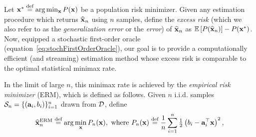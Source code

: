 \begin{table}[t]
\begin{center}
{                  %
                }\vspace*{-1cm}

		\label{tab:comp}
	\end{center}
\end{table}
Let $\mathbf{x}^* \stackrel{\textrm{def}}{=} \arg\min_{\mathbf{x}} P(\mathbf{x})$ be a population risk minimizer.  Given any estimation procedure which returns $\widehat{\mathbf{x}}_n $ using $n$ samples, define the {\em excess risk} (which we also refer to as the \emph{generalization error} or the \emph{error}) of $\widehat{\mathbf{x}}_n$ as $\mathbb{E}\left[P(\widehat{\mathbf{x}}_n)\right]-P(\mathbf{x}^*)$.
Now, equipped a stochastic first-order oracle (equation~\eqref{eq:stochFirstOrderOracle}), our goal is to provide a computationally efficient (and streaming) estimation method whose excess risk is comparable to the optimal statistical minimax rate.  

In the limit of large $n$, this minimax rate is achieved by the {\em empirical risk minimizer} (ERM), which is defined as follows. Given $n$ i.i.d. samples $\mathcal{S}_n=\{(\mathbf{a}_i,b_i)\}_{i=1}^n$ drawn from $\mathcal{D}$, define 
\vspace*{-3mm}
\begin{align*} 
	\widehat{\mathbf{x}}_n^{\textrm{ERM}} \stackrel{\textrm{def}}{=} \arg\min_{\mathbf{x}} P_n(\mathbf{x}) , \textrm{ where } P_n(\mathbf{x})\stackrel{\textrm{def}}{=}\frac{1}{n}\sum_{i=1}^{n} \tfrac{1}{2}\left(b_i-\mathbf{a}_i^{\top} \mathbf{x} \right)^2,
\end{align*}


